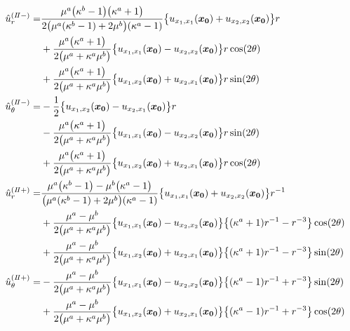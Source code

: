 \begin{align}
	\hat{u}_{r}^{(I\hspace{-.15em}I-)}=&
		\frac{\mu^{a}\bigl(\kappa^{b}-1\bigr)\bigl(\kappa^{a}+1\bigr)}{2\bigl(\mu^{a}(\kappa^{b}-1)+2\mu^{b}\bigr)(\kappa^{a}-1)}
		\bigl\{u_{x_{1},x_{1}}(\bm{x_{0}})+u_{x_{2},x_{2}}(\bm{x_{0}})\bigr\}r
		\nonumber
		\\
		&+\frac{\mu^{a}\bigl(\kappa^{a}+1\bigr)}{2\bigl(\mu^{a}+\kappa^{a}\mu^{b}\bigr)}
		\bigl\{u_{x_{1},x_{1}}(\bm{x_{0}})-u_{x_{2},x_{2}}(\bm{x_{0}})\bigr\}r\cos(2\theta)
		\nonumber
		\\
		&+\frac{\mu^{a}\bigl(\kappa^{a}+1\bigr)}{2\bigl(\mu^{a}+\kappa^{a}\mu^{b}\bigr)}
		\bigl\{u_{x_{1},x_{2}}(\bm{x_{0}})+u_{x_{2},x_{1}}(\bm{x_{0}})\bigr\}r\sin(2\theta)
		\\
	\hat{u}_{\theta}^{(I\hspace{-.15em}I-)}=&
		-\frac{1}{2}\bigl\{u_{x_{1},x_{2}}(\bm{x_{0}})-u_{x_{2},x_{1}}(\bm{x_{0}})\bigr\}r
		\nonumber
		\\
		&-\frac{\mu^{a}\bigl(\kappa^{a}+1\bigr)}{2\bigl(\mu^{a}+\kappa^{a}\mu^{b}\bigr)}
		\bigl\{u_{x_{1},x_{1}}(\bm{x_{0}})-u_{x_{2},x_{2}}(\bm{x_{0}})\bigr\}r\sin(2\theta)
		\nonumber
		\\
		&+\frac{\mu^{a}\bigl(\kappa^{a}+1\bigr)}{2\bigl(\mu^{a}+\kappa^{a}\mu^{b}\bigr)}
		\bigl\{u_{x_{1},x_{2}}(\bm{x_{0}})+u_{x_{2},x_{1}}(\bm{x_{0}})\bigr\}r\cos(2\theta)
		\\
	\hat{u}_{r}^{(I\hspace{-.15em}I+)}=&
		\frac{\mu^{a}\bigl(\kappa^{b}-1\bigr)-\mu^{b}\bigl(\kappa^{a}-1\bigr)}{\bigl(\mu^{a}(\kappa^{b}-1)+2\mu^{b}\bigr)(\kappa^{a}-1)}
		\bigl\{u_{x_{1},x_{1}}(\bm{x_{0}})+u_{x_{2},x_{2}}(\bm{x_{0}})\bigr\}r^{-1}
		\nonumber
		\\
		&+\frac{\mu^{a}-\mu^{b}}{2\bigl(\mu^{a}+\kappa^{a}\mu^{b}\bigr)}
		\bigl\{u_{x_{1},x_{1}}(\bm{x_{0}})-u_{x_{2},x_{2}}(\bm{x_{0}})\bigr\}
		\bigl\{(\kappa^{a}+1)r^{-1}-r^{-3}\bigr\}\cos(2\theta)
		\nonumber
		\\
		&+\frac{\mu^{a}-\mu^{b}}{2\bigl(\mu^{a}+\kappa^{a}\mu^{b}\bigr)}
		\bigl\{u_{x_{1},x_{2}}(\bm{x_{0}})+u_{x_{2},x_{1}}(\bm{x_{0}})\bigr\}
		\bigl\{(\kappa^{a}+1)r^{-1}-r^{-3}\bigr\}\sin(2\theta)
		\\
	\hat{u}_{\theta}^{(I\hspace{-.15em}I+)}=&
		-\frac{\mu^{a}-\mu^{b}}{2\bigl(\mu^{a}+\kappa^{a}\mu^{b}\bigr)}
		\bigl\{u_{x_{1},x_{1}}(\bm{x_{0}})-u_{x_{2},x_{2}}(\bm{x_{0}})\bigr\}
		\bigl\{(\kappa^{a}-1)r^{-1}+r^{-3}\bigr\}\sin(2\theta)
		\nonumber
		\\
		&+\frac{\mu^{a}-\mu^{b}}{2\bigl(\mu^{a}+\kappa^{a}\mu^{b}\bigr)}
		\bigl\{u_{x_{1},x_{2}}(\bm{x_{0}})+u_{x_{2},x_{1}}(\bm{x_{0}})\bigr\}
		\bigl\{(\kappa^{a}-1)r^{-1}+r^{-3}\bigr\}\cos(2\theta)
\end{align}

\newpage
